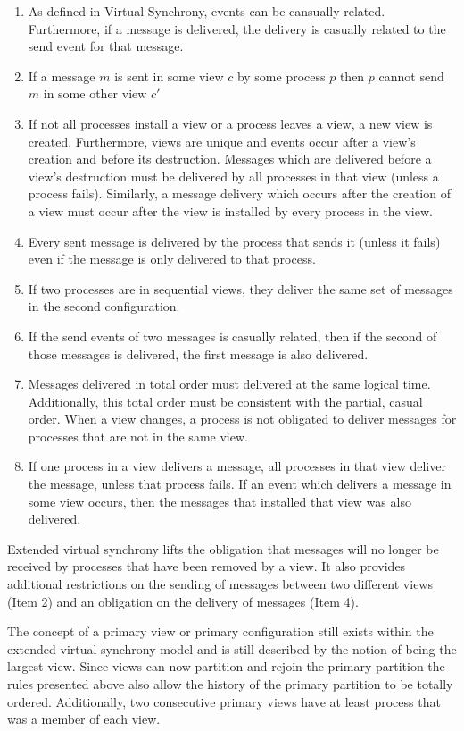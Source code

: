 \begin{enumerate}
	\item As defined in Virtual Synchrony, events can be cansually related.
		Furthermore, if a message is delivered, the delivery is casually
		related to the send event for that message. 
	\item If a message $m$ is sent in some view $c$ by some process $p$ then $p$
		cannot send $m$ in some other view $c'$
	\item If not all processes install a view or a process leaves a view, a new
		view is created. Furthermore, views are unique and events occur after a
		view's creation and before its destruction. Messages which are delivered
		before a view's destruction must be delivered by all processes in that
		view (unless a process fails). Similarly, a message delivery which occurs
		after the creation of a view must occur after the view is installed by
		every process in the view.
	\item Every sent message is delivered by the process that sends it (unless it
		fails) even if the message is only delivered to that process.
	\item If two processes are in sequential views, they deliver the same set of
		messages in the second configuration.
	\item If the send events of two messages is casually related, then if the
		second of those messages is delivered, the first message is also delivered.
	\item Messages delivered in total order must delivered at the same logical time.
		Additionally, this total order must be consistent with the partial, casual
		order. When a view changes, a process is not obligated to deliver messages
		for processes that are not in the same view.
	\item If one process in a view delivers a message, all processes in that view
		deliver the message, unless that process fails. If an event which delivers
		a message in some view occurs, then the messages that installed that view
		was also delivered.
\end{enumerate}

Extended virtual synchrony lifts the obligation that messages will no longer be
received by processes that have been removed by a view. It also provides
additional restrictions on the sending of messages between two different views
(Item 2) and an obligation on the delivery of messages (Item 4). 

The concept of a primary view or primary configuration still exists within the
extended virtual synchrony model and is still described by the notion of being
the largest view. Since views can now partition and rejoin the primary partition
the rules presented above also allow the history of the primary partition to be
totally ordered. Additionally, two consecutive primary views have at least
process that was a member of each view.

